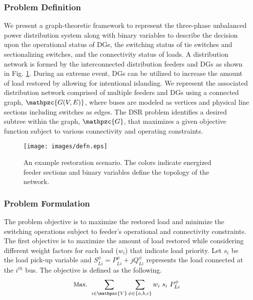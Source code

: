 \documentclass[12pt]{article}
\begin{document}
\subsubsection{Problem Definition}
We present a graph-theoretic framework to represent the three-phase unbalanced power distribution system along with binary variables to describe the decision upon the operational status of DGs, the switching status of tie switches and sectionalizing switches, and the connectivity status of loads. A distribution network is formed by the interconnected distribution feeders and DGs as shown in Fig. \ref{fig:defn}. During an extreme event, DGs can be utilized to increase the amount of load restored by allowing for intentional islanding. We represent the associated distribution network comprised of multiple feeders and DGs using a connected graph, $\mathpzc{G(V, E)}$, where buses are modeled as vertices and physical line sections including switches as edges. The DSR problem identifies a desired subtree within the graph, $\mathpzc{G}$, that maximizes a given objective function subject to various connectivity and operating constraints.

    \begin{figure}[t]
        \centering
        \texttt{[image: images/defn.eps]}
        \vspace{-0.3cm}
        \caption{An example restoration scenario. The colors indicate energized feeder sections and binary variables define the topology of the network.}
        \label{fig:defn}
    \end{figure}

\subsubsection{Problem Formulation}

The problem objective is to maximize the restored load and minimize the switching operations subject to feeder's operational and connectivity constraints.
The first objective is to maximize the amount of load restored while considering different weight factors for each load ($w_i$) that indicate load priority. Let $s_i$ be the load pick-up variable and $S_{Li}^\phi = P_{Li}^\phi+jQ_{Li}^\phi$ represents the load connected at the $i^{th}$ bus. 
    The objective is defined as the following.
    \begin{equation}
    \small
    \text{Max.   } \sum_{i\in  \mathpzc{V}}\sum_{\phi\in\{a,b,c\}}w_i\ s_i\ P_{Li}^{\phi}
    \end{equation}
\vspace{-0.1cm}
\end{document}
